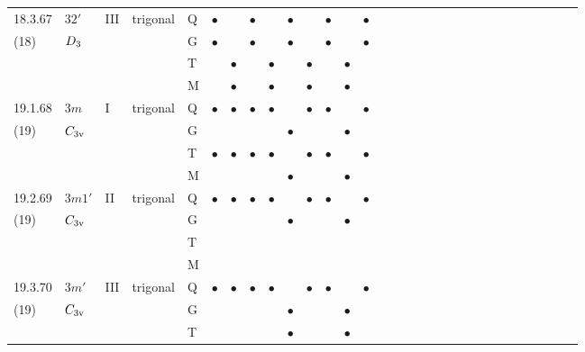 \documentclass[fleqn,9pt,landscape]{jsarticle}
\begin{document}
\begin{longtable}{lllll|l|l|l|l|l|l|l|l|l|ll|ll|ll|ll|ll|ll|ll|ll}
18.3.67 & \texttt{$32'$} & III & trigonal & Q & $\bullet$ &  & $\bullet$ &  & $\bullet$ &  & $\bullet$ &  & $\bullet$ &  &  &  &  &  &  &  &  &  &  &  &  &  &  &  &  \\
(18) & $D_{\rm 3}$ &  &  & G & $\bullet$ &  & $\bullet$ &  & $\bullet$ &  & $\bullet$ &  & $\bullet$ &  &  &  &  &  &  &  &  &  &  &  &  &  &  &  &  \\
 &  &  &  & T &  & $\bullet$ &  & $\bullet$ &  & $\bullet$ &  & $\bullet$ &  &  &  &  &  &  &  &  &  &  &  &  &  &  &  &  &  \\
 &  &  &  & M &  & $\bullet$ &  & $\bullet$ &  & $\bullet$ &  & $\bullet$ &  &  &  &  &  &  &  &  &  &  &  &  &  &  &  &  &  \\ \hline
19.1.68 & \texttt{$3m$} & I & trigonal & Q & $\bullet$ & $\bullet$ & $\bullet$ & $\bullet$ &  & $\bullet$ & $\bullet$ &  & $\bullet$ &  &  &  &  &  &  &  &  &  &  &  &  &  &  &  &  \\
(19) & $C_{\rm 3v}$ &  &  & G &  &  &  &  & $\bullet$ &  &  & $\bullet$ &  &  &  &  &  &  &  &  &  &  &  &  &  &  &  &  &  \\
 &  &  &  & T & $\bullet$ & $\bullet$ & $\bullet$ & $\bullet$ &  & $\bullet$ & $\bullet$ &  & $\bullet$ &  &  &  &  &  &  &  &  &  &  &  &  &  &  &  &  \\
 &  &  &  & M &  &  &  &  & $\bullet$ &  &  & $\bullet$ &  &  &  &  &  &  &  &  &  &  &  &  &  &  &  &  &  \\ \hline
19.2.69 & \texttt{$3m1'$} & II & trigonal & Q & $\bullet$ & $\bullet$ & $\bullet$ & $\bullet$ &  & $\bullet$ & $\bullet$ &  & $\bullet$ &  &  &  &  &  &  &  &  &  &  &  &  &  &  &  &  \\
(19) & $C_{\rm 3v}$ &  &  & G &  &  &  &  & $\bullet$ &  &  & $\bullet$ &  &  &  &  &  &  &  &  &  &  &  &  &  &  &  &  &  \\
 &  &  &  & T &  &  &  &  &  &  &  &  &  &  &  &  &  &  &  &  &  &  &  &  &  &  &  &  &  \\
 &  &  &  & M &  &  &  &  &  &  &  &  &  &  &  &  &  &  &  &  &  &  &  &  &  &  &  &  &  \\ \hline
19.3.70 & \texttt{$3m'$} & III & trigonal & Q & $\bullet$ & $\bullet$ & $\bullet$ & $\bullet$ &  & $\bullet$ & $\bullet$ &  & $\bullet$ &  &  &  &  &  &  &  &  &  &  &  &  &  &  &  &  \\
(19) & $C_{\rm 3v}$ &  &  & G &  &  &  &  & $\bullet$ &  &  & $\bullet$ &  &  &  &  &  &  &  &  &  &  &  &  &  &  &  &  &  \\
 &  &  &  & T &  &  &  &  & $\bullet$ &  &  & $\bullet$ &  &  &  &  &  &  &  &  &  &  &  &  &  &  &  &  &  \\

\end{longtable}
\end{document}
